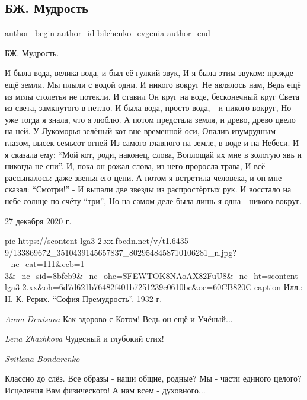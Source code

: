  
 
 
 
 
 
\subsection{БЖ. Мудрость}
\label{sec:27_12_2020.fb.bilchenko_evgenia.3.mudrost}
\ifcmt
 author_begin
   author_id bilchenko_evgenia
 author_end
\fi

БЖ. Мудрость.

И была вода, велика вода, и был её гулкий звук,
И я была этим звуком: прежде ещё земли.
Мы плыли с водой одни. И никого вокруг
Не являлось нам, 
Ведь ещё из мглы столетья не потекли.
И ставил Он круг на воде, бесконечный круг
Света из света, замкнутого в петлю.
И была вода, просто вода, - и никого вокруг,
Но уже тогда я знала, что я люблю.
А потом предстала земля, и древо, древо цвело на ней.
У Лукоморья зелёный кот вне временной оси,
Опалив изумрудным глазом, высек семьсот огней
Из самого главного на земле, в воде и на Небеси.
И я сказала ему: \enquote{Мой кот, роди, наконец, слова,
Воплощай их мне в золотую явь и никогда не спи}.
И, пока он рожал слова, из него проросла трава,
И всё рассыпалось: даже звенья его цепи.
А потом я встретила человека, и он мне сказал: \enquote{Смотри!} -
И выпали две звезды из распростёртых рук.
И восстало на небе солнце по счёту \enquote{три},
Но на самом деле была лишь я одна - никого вокруг.

27 декабря 2020 г.

\ifcmt
  pic https://scontent-lga3-2.xx.fbcdn.net/v/t1.6435-9/133869672_3510439145657837_8029548458710106281_n.jpg?_nc_cat=111&ccb=1-3&_nc_sid=8bfeb9&_nc_ohc=SFEWTOK8NAoAX82FuU8&_nc_ht=scontent-lga3-2.xx&oh=6d7d621b76482f401b7251239c0610bc&oe=60CB820C
	caption Илл.: Н. К. Рерих. \enquote{София-Премудрость}. 1932 г.
\fi

\emph{Anna Denisova}
Как здорово с Котом! Ведь он ещё и Учёный...

\emph{Lena Zhazhkova}
Чудесный и глубокий стих!

\emph{Svitlana Bondarenko}

Классно до слёз. Все образы - наши общие, родные? Мы - части единого целого?
Исцеления Вам физического! А нам всем - духовного...
